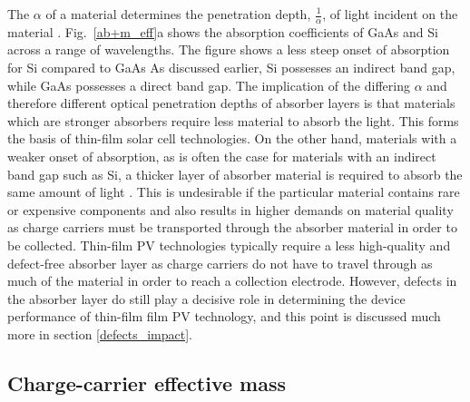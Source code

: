 \documentclass[11pt, twoside]{report}
\begin{document}
The $\alpha$ of a material determines the penetration depth, $\frac{1}{\alpha}$, of light incident on the material \cite{absorption_coeff_book1}. Fig.~\ref{ab+m_eff}a shows the absorption coefficients of GaAs and Si across a range of wavelengths. The figure shows a less steep onset of absorption for Si compared to GaAs As discussed earlier, Si possesses an indirect band gap, while GaAs possesses a direct band gap. 
The implication of the differing $\alpha$ and therefore different optical penetration depths of absorber layers is that materials which are stronger absorbers require less material to absorb the light. This forms the basis of thin-film solar cell technologies.
On the other hand, materials with a weaker onset of absorption, as is often the case for materials with an indirect band gap such as Si, a thicker layer of absorber material is required to absorb the same amount of light \cite{PV_bands_book}. This is undesirable if the particular material contains rare or expensive components and also results in higher demands on material quality as charge carriers must be transported through the absorber material in order to be collected.
Thin-film PV technologies typically require a less high-quality and defect-free absorber layer as charge carriers do not have to travel through as much of the material in order to reach a collection electrode. However, defects in the absorber layer do still play a decisive role in determining the device performance of thin-film film PV technology, and this point is discussed much more in section \ref{defects_impact}.

\subsection{Charge-carrier effective mass}
\end{document}

